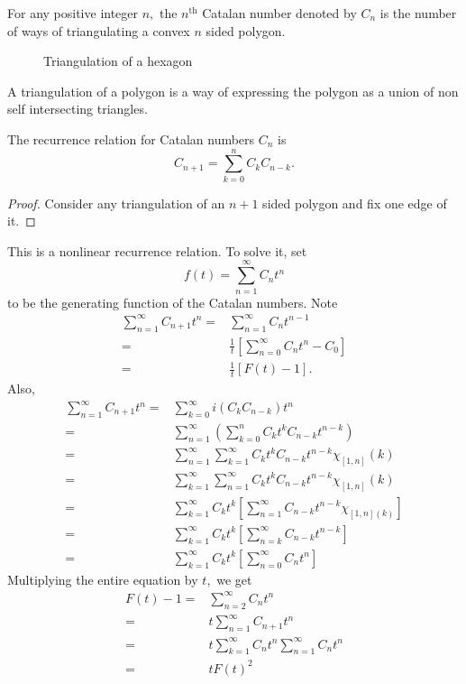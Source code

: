

\begin{definition}
	For any positive integer $n,$ the $n^\text{th}$ Catalan number
	denoted by $C_n$ is the number of ways of triangulating a convex
	$n$ sided polygon.
\end{definition}

\begin{center}
	\begin{figure}[h]
		\centering
		\caption{Triangulation of a hexagon}
		\label{fig:triangulation-hexagon}
	\end{figure}
\end{center}

A triangulation of a polygon is a way of expressing the polygon as
a union of non self intersecting triangles.

The recurrence relation for Catalan numbers $C_n$ is 
$$C_{n+1} = \sum_{k=0}^{n} C_k C_{n-k}.$$
\begin{proof}
	Consider any triangulation of an $n+1$ sided polygon and fix one edge of it.
	
\end{proof}

This is a nonlinear recurrence relation. To solve it, set
$$ f(t) = \sum_{n=1}^{\infty} C_n t^n $$
to be the generating function of the Catalan numbers.
Note 
\begin{align*}
	\sum_{n=1}^{\infty} C_{n+1} t^n
	 ={}& \sum_{n=1}^{\infty} C_n t^{n-1} \\
	 ={}& \frac{1}{t} \left[ \sum_{n=0}^{\infty} C_n t^n - C_0 \right] \\
	 ={}& \frac{1}{t} \left[ F(t) - 1 \right].
\end{align*}
 Also,
 \begin{align*}
	 \sum_{n=1}^{\infty} C_{n+1} t^n
	 ={}& \sum_{k=0}^{\infty} i\left( C_k C_{n-k} \right) t^n \\
	 ={}& \sum_{n=1}^{\infty} \left( \sum_{k=0}^{n} C_k t^k C_{n-k}
	 t^{n-k}\right) \\
	 ={}& \sum_{n=1}^{\infty} \sum_{k=1}^{\infty} 
	 C_k t^k C_{n-k} t^{n-k} \chi_{[1,n]} (k) \\
	 ={}& \sum_{k=1}^{\infty} \sum_{n=1}^{\infty} 
	 C_k t^k C_{n-k} t^{n-k} \chi_{[1,n]} (k) \\
	 ={}& \sum_{k=1}^{\infty} C_k t^k
	 \left[ \sum_{n=1}^{\infty} C_{n-k} t^{n-k} \chi_{[1,n](k)} \right] \\
	 ={}& \sum_{k=1}^{\infty} C_k t^{k} \left[ 
	 \sum_{n=k}^{\infty} C_{n-k} t^{n-k} \right] \\
	 ={}& \sum_{k=1}^{\infty} C_k t^k
	 \left[ \sum_{n=0}^{\infty} C_n t^n \right]
 \end{align*}
 Multiplying the entire equation by $t,$ we get
 \begin{align*}
	 F(t) - 1
	 ={}& \sum_{n=2}^{\infty} C_{n} t^n\\
	 ={}& t \sum_{n=1}^{\infty} C_{n+1}t^n\\
	 ={}& t \sum_{k=1}^{\infty} C_n t^n \sum_{n=1}^{\infty} C_n t^n
	 \\
	 ={}& t F(t)^2
 \end{align*}

